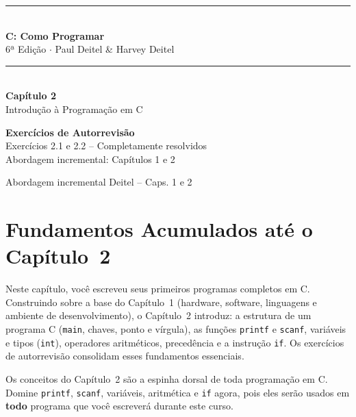 \documentclass[12pt,a4paper]{article}
\begin{document}
\begin{titlepage}
  \centering\vspace*{2cm}
  {\color{deitelblue}\rule{\linewidth}{2pt}}\\[0.4cm]
  {\huge\bfseries\color{deitelblue}C: Como Programar}\\[0.2cm]
  {\large\color{deitelblue}6ª Edição $\cdot$ Paul Deitel \& Harvey Deitel}\\[0.2cm]
  {\color{deitelblue}\rule{\linewidth}{2pt}}\\[1cm]
  {\LARGE\bfseries Capítulo 2}\\[0.3cm]
  {\Large\color{deitelblue!80}Introdução à Programação em C}\\[0.8cm]
  \begin{tcolorbox}[colback=deitellightblue,colframe=deitelblue,width=0.8\linewidth]
    \centering
    {\large\bfseries Exercícios de Autorrevisão}\\[0.2cm]
    {\normalsize Exercícios 2.1 e 2.2 -- Completamente resolvidos\\
    Abordagem incremental: Capítulos 1 e 2}
  \end{tcolorbox}
  \vfill{\small Abordagem incremental Deitel -- Caps. 1 e 2}
\end{titlepage}

\section*{Fundamentos Acumulados até o Capítulo~2}

Neste capítulo, você escreveu seus primeiros programas completos em C. Construindo sobre a
base do Capítulo~1 (hardware, software, linguagens e ambiente de desenvolvimento), o
Capítulo~2 introduz: a estrutura de um programa C (\texttt{main}, chaves, ponto e vírgula),
as funções \texttt{printf} e \texttt{scanf}, variáveis e tipos (\texttt{int}), operadores
aritméticos, precedência e a instrução \texttt{if}. Os exercícios de autorrevisão consolidam
esses fundamentos essenciais.

\begin{boaprática}
  Os conceitos do Capítulo~2 são a espinha dorsal de toda programação em C. Domine
  \texttt{printf}, \texttt{scanf}, variáveis, aritmética e \texttt{if} agora, pois eles
  serão usados em \textbf{todo} programa que você escreverá durante este curso.
\end{boaprática}

\tableofcontents\newpage

\end{document}

